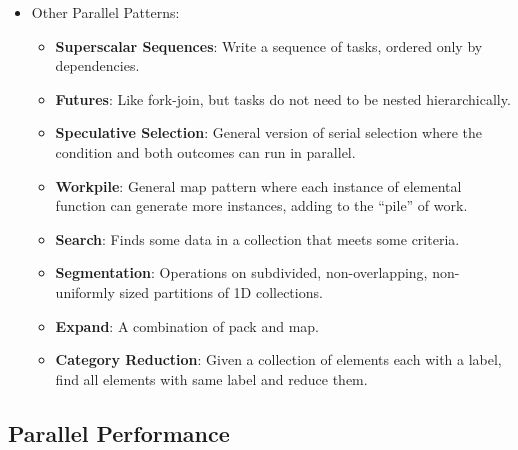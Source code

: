 \begin{itemize}
\begin{itemize}
    \end{itemize}
    \item Other Parallel Patterns:
    \begin{itemize}
        \item \textbf{Superscalar Sequences}: Write a sequence of tasks, ordered only by dependencies.
        \item \textbf{Futures}: Like fork-join, but tasks do not need to be nested hierarchically.
%
\clearpage
%
        \item \textbf{Speculative Selection}: General version of serial selection where the condition and both outcomes can run in parallel.
        \item \textbf{Workpile}: General map pattern where each instance of elemental function can generate more instances, adding to the \enquote{pile} of work.
        \item \textbf{Search}: Finds some data in a collection that meets some criteria.
        \item \textbf{Segmentation}: Operations on subdivided, non-overlapping, non-uniformly sized partitions of 1D collections.
        \item \textbf{Expand}: A combination of pack and map.
        \item \textbf{Category Reduction}: Given a collection of elements each with a label, find all elements with same label and reduce them.
    \end{itemize}
\end{itemize}
%
%
\subsection{Parallel Performance}
